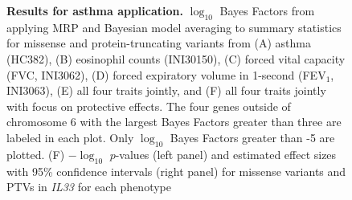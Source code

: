 \begin{figure}[!h]
\caption{{\bf Results for asthma application.}
$\log_{10}$ Bayes Factors from applying MRP and Bayesian model averaging to summary statistics for missense and protein-truncating variants from (A) asthma (HC382), (B) eosinophil counts (INI30150), (C) forced vital capacity (FVC, INI3062), (D) forced expiratory volume in 1-second (FEV$_1$, INI3063), (E) all four traits jointly, and (F) all four traits jointly with focus on protective effects. The four genes outside of chromosome 6 with the largest Bayes Factors greater than three are labeled in each plot. Only $\log_{10}$ Bayes Factors greater than -5 are plotted. (F) $-\log_{10}$ $p$-values (left panel) and estimated effect sizes with 95\% confidence intervals (right panel) for missense variants and PTVs in \textit{IL33} for each phenotype}
\label{asthma_bma}
\end{figure}

